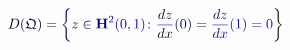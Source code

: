 \documentclass[12pt]{article}
\begin{document}
\makeatletter
\renewcommand*{\@textcolor}[3]{%
  \protect\leavevmode
  \begingroup
    \color#1{#2}#3%
  \endgroup
}
\makeatother
\begin{displaymath}
\mathcolor[RGB]{0,0,15}{D} \mathcolor[RGB]{0,0,30}{(} \mathfrak { \mathcolor[RGB]{0,0,45}{Q} } \mathcolor[RGB]{0,0,60}{)} \mathcolor[RGB]{0,0,75}{=} \mathcolor[RGB]{0,0,90}{\left\{} \mathcolor[RGB]{0,0,105}{z} \mathcolor[RGB]{0,0,120}{\in} \mathbf { \mathcolor[RGB]{0,0,135}{H} } ^ { \mathcolor[RGB]{0,0,150}{2} } \mathcolor[RGB]{0,0,165}{(} \mathcolor[RGB]{0,0,180}{0} \mathcolor[RGB]{0,0,195}{,} \mathcolor[RGB]{0,0,210}{1} \mathcolor[RGB]{0,0,225}{)} \mathcolor[RGB]{0,0,240}{\colon} \mathcolor[RGB]{0,0,255}{\frac { \mathcolor[RGB]{0,15,0}{d} \mathcolor[RGB]{0,15,15}{z} } { \mathcolor[RGB]{0,15,30}{d} \mathcolor[RGB]{0,15,45}{x} } } \mathcolor[RGB]{0,15,60}{(} \mathcolor[RGB]{0,15,75}{0} \mathcolor[RGB]{0,15,90}{)} \mathcolor[RGB]{0,15,105}{=} \mathcolor[RGB]{0,15,120}{\frac { \mathcolor[RGB]{0,15,135}{d} \mathcolor[RGB]{0,15,150}{z} } { \mathcolor[RGB]{0,15,165}{d} \mathcolor[RGB]{0,15,180}{x} } } \mathcolor[RGB]{0,15,195}{(} \mathcolor[RGB]{0,15,210}{1} \mathcolor[RGB]{0,15,225}{)} \mathcolor[RGB]{0,15,240}{=} \mathcolor[RGB]{0,15,255}{0} \mathcolor[RGB]{0,30,0}{\right\}}
\end{displaymath}
\end{document}
